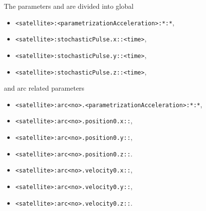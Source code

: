 The parameters and  are divided into global
\begin{itemize}
\item \verb|<satellite>:<parametrizationAcceleration>:*:*|,
\item \verb|<satellite>:stochasticPulse.x::<time>|,
\item \verb|<satellite>:stochasticPulse.y::<time>|,
\item \verb|<satellite>:stochasticPulse.z::<time>|,
\end{itemize}
and arc related parameters
\begin{itemize}
\item \verb|<satellite>:arc<no>.<parametrizationAcceleration>:*:*|,
\item \verb|<satellite>:arc<no>.position0.x::|,
\item \verb|<satellite>:arc<no>.position0.y::|,
\item \verb|<satellite>:arc<no>.position0.z::|.
\item \verb|<satellite>:arc<no>.velocity0.x::|,
\item \verb|<satellite>:arc<no>.velocity0.y::|,
\item \verb|<satellite>:arc<no>.velocity0.z::|.
\end{itemize}


